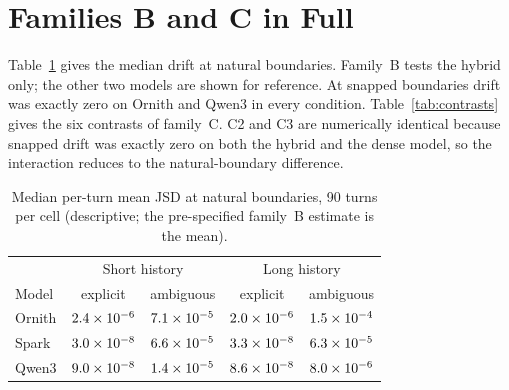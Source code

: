 \section{Families B and C in Full}
\label{app:families}

Table~\ref{tab:drift} gives the median drift at natural boundaries. Family~B
tests the hybrid only; the other two models are shown for reference. At snapped
boundaries drift was exactly zero on Ornith and Qwen3 in every condition.
Table~\ref{tab:contrasts} gives the six contrasts of family~C. C2 and C3 are
numerically identical because snapped drift was exactly zero on both the hybrid
and the dense model, so the interaction reduces to the natural-boundary
difference.

\begin{table}[h]
\caption{Median per-turn mean JSD at natural boundaries, 90 turns per cell
(descriptive; the pre-specified family~B estimate is the mean).}
\label{tab:drift}
\small
\begin{tabular}{@{}lcccc@{}}
\toprule
 & \multicolumn{2}{c}{Short history} & \multicolumn{2}{c}{Long history} \\
Model & explicit & ambiguous & explicit & ambiguous \\
\midrule
Ornith & $2.4\times10^{-6}$ & $7.1\times10^{-5}$ & $2.0\times10^{-6}$ & $1.5\times10^{-4}$ \\
Spark & $3.0\times10^{-8}$ & $6.6\times10^{-5}$ & $3.3\times10^{-8}$ & $6.3\times10^{-5}$ \\
Qwen3 & $9.0\times10^{-8}$ & $1.4\times10^{-5}$ & $8.6\times10^{-8}$ & $8.0\times10^{-6}$ \\
\bottomrule
\end{tabular}
\end{table}

